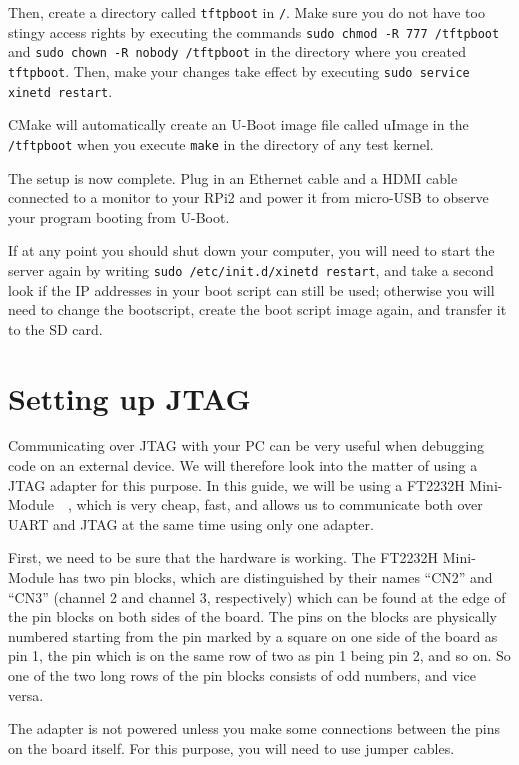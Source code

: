 \documentclass[a4paper,11pt,reqno]{amsart}
\begin{document}
{Then, create a directory called \texttt{tftpboot} in \texttt{/}. Make sure you do not have too stingy access rights by executing the commands \texttt{sudo chmod -R 777 /tftpboot} and \texttt{sudo chown -R nobody /tftpboot} in the directory where you created \texttt{tftpboot}. Then, make your changes take effect by executing \texttt{sudo service xinetd restart}.

CMake will automatically create an U-Boot image file called uImage in the \texttt{/tftpboot} when you execute \texttt{make} in the directory of any test kernel.

The setup is now complete. Plug in an Ethernet cable and a HDMI cable connected to a monitor to your RPi2 and power it from micro-USB to observe your program booting from U-Boot.

If at any point you should shut down your computer, you will need to start the server again by writing \texttt{sudo /etc/init.d/xinetd restart}, and take a second look if the IP addresses in your boot script can still be used; otherwise you will need to change the bootscript, create the boot script image again, and transfer it to the SD card.

\section{Setting up JTAG}
Communicating over JTAG with your PC can be very useful when debugging code on an external device. We will therefore look into the matter of using a JTAG adapter for this purpose. In this guide, we will be using a FT2232H Mini-Module~\cite{ft2232h}~\cite{ft2232hmm}, which is very cheap, fast, and allows us to communicate both over UART and JTAG at the same time using only one adapter.

First, we need to be sure that the hardware is working. The FT2232H Mini-Module has two pin blocks, which are distinguished by their names ``CN2'' and ``CN3'' (channel 2 and channel 3, respectively) which can be found at the edge of the pin blocks on both sides of the board. The pins on the blocks are physically numbered starting from the pin marked by a square on one side of the board as pin 1, the pin which is on the same row of two as pin 1 being pin 2, and so on. So one of the two long rows of the pin blocks consists of odd numbers, and vice versa.

The adapter is not powered unless you make some connections between the pins on the board itself. For this purpose, you will need to use jumper cables.

}
\end{document}
